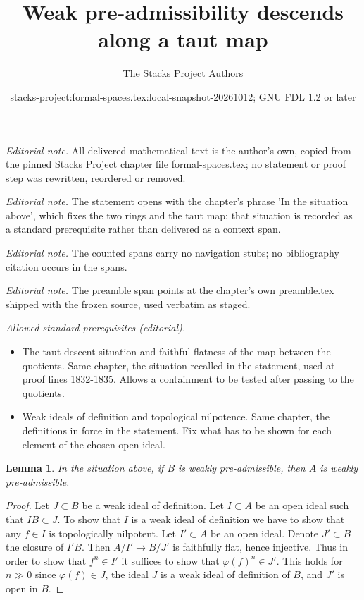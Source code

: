 \documentclass{stacks-project}
\title{Weak pre-admissibility descends along a taut map}
\author{The Stacks Project Authors}
\date{stacks-project:formal-spaces.tex:local-snapshot-20261012; GNU FDL 1.2 or later}
\theoremstyle{plain}
\newtheorem{lemma}[subsection]{Lemma}
\theoremstyle{definition}
\theoremstyle{remark}
\numberwithin{equation}{subsection}
\begin{document}
\maketitle
\noindent\textit{Editorial note.} All delivered mathematical text is the author's own, copied from the pinned Stacks Project chapter file formal-spaces.tex; no statement or proof step was rewritten, reordered or removed.\par\medskip
\noindent\textit{Editorial note.} The statement opens with the chapter's phrase 'In the situation above', which fixes the two rings and the taut map; that situation is recorded as a standard prerequisite rather than delivered as a context span.\par\medskip
\noindent\textit{Editorial note.} The counted spans carry no navigation stubs; no bibliography citation occurs in the spans.\par\medskip
\noindent\textit{Editorial note.} The preamble span points at the chapter's own preamble.tex shipped with the frozen source, used verbatim as staged.\par\medskip
\noindent\textit{Allowed standard prerequisites (editorial).}\begin{itemize}
\item The taut descent situation and faithful flatness of the map between the quotients. Same chapter, the situation recalled in the statement, used at proof lines 1832-1835. Allows a containment to be tested after passing to the quotients.
\item Weak ideals of definition and topological nilpotence. Same chapter, the definitions in force in the statement. Fix what has to be shown for each element of the chosen open ideal.
\end{itemize}\medskip
\begin{lemma}
\label{lemma-taut-descent-weakly-admissible}
In the situation above, if $B$ is weakly pre-admissible, then
$A$ is weakly pre-admissible.
\end{lemma}

\begin{proof}
Let $J \subset B$ be a weak ideal of definition. Let $I \subset A$
be an open ideal such that $IB \subset J$. To show that $I$ is a weak ideal
of definition we have to show that any $f \in I$ is topologically nilpotent.
Let $I' \subset A$ be an open ideal. Denote $J' \subset B$ the closure
of $I'B$. Then $A/I' \to B/J'$ is faithfully flat, hence injective.
Thus in order to show that $f^n \in I'$ it suffices to show
that $\varphi(f)^n \in J'$. This holds for $n \gg 0$ since
$\varphi(f) \in J$, the ideal $J$ is a weak ideal of definition of $B$,
and $J'$ is open in $B$.
\end{proof}
\end{document}

